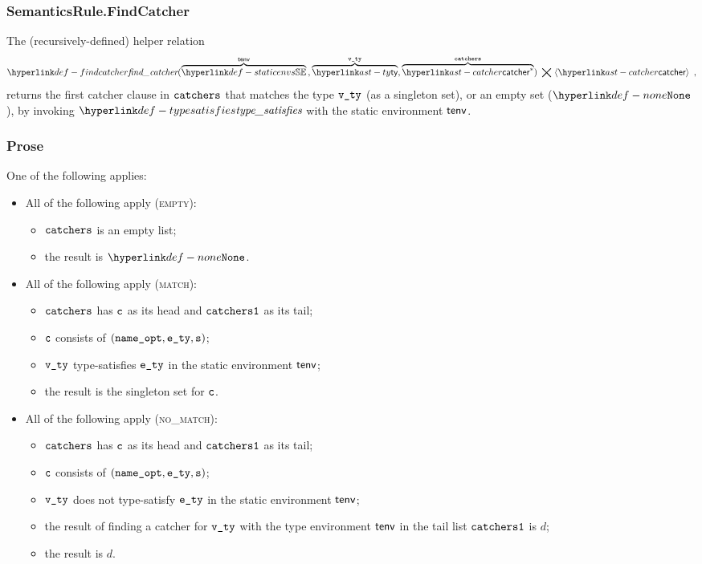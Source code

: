 \begin{mathpar}
\end{mathpar}

\subsubsection{SemanticsRule.FindCatcher\label{sec:SemanticsRule.FindCatcher}}
\hypertarget{def-findcatcher}{}
The (recursively-defined) helper relation
\[
  \findcatcher(\overname{\staticenvs}{\tenv} \aslsep \overname{\ty}{\vvty}, \overname{\catcher^*}{\catchers})
  \;\aslrel\; \langle \catcher \rangle \enspace,
\]
returns the first catcher clause in $\catchers$ that matches the type $\vvty$ (as a singleton set), or an empty set ($\None$),
by invoking $\typesat$ with the static environment $\tenv$.

\subsubsection{Prose}
One of the following applies:
\begin{itemize}
  \item All of the following apply (\textsc{empty}):
  \begin{itemize}
    \item $\catchers$ is an empty list;
    \item the result is $\None$.
  \end{itemize}

  \item All of the following apply (\textsc{match}):
  \begin{itemize}
    \item $\catchers$ has $\vc$ as its head and $\catchersone$ as its tail;
    \item $\vc$ consists of $(\nameopt, \ety, \vs)$;
    \item $\vvty$ type-satisfies $\ety$ in the static environment $\tenv$;
    \item the result is the singleton set for $\vc$.
  \end{itemize}

  \item All of the following apply (\textsc{no\_match}):
  \begin{itemize}
    \item $\catchers$ has $\vc$ as its head and $\catchersone$ as its tail;
    \item $\vc$ consists of $(\nameopt, \ety, \vs)$;
    \item $\vvty$ does not type-satisfy $\ety$ in the static environment $\tenv$;
    \item the result of finding a catcher for $\vvty$ with the type environment $\tenv$ in the tail list $\catchersone$
    is $d$;
    \item the result is $d$.
  \end{itemize}
\end{itemize}

